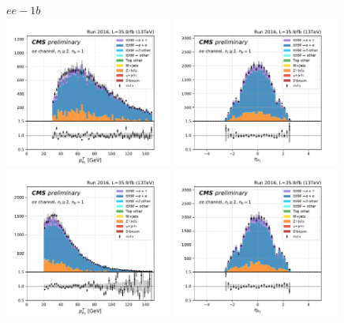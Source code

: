 












\begin{figure}[ht]
    \centering
    $ee - 1b$ \\
    \includegraphics[width=0.49\textwidth]{chapters/Appendix/sectionPlots/figures/kinematics_pickles/ee/1b/ee_1b_lepton1_pt.pdf}
    \includegraphics[width=0.49\textwidth]{chapters/Appendix/sectionPlots/figures/kinematics_pickles/ee/1b/ee_1b_lepton1_eta.pdf}
    \includegraphics[width=0.49\textwidth]{chapters/Appendix/sectionPlots/figures/kinematics_pickles/ee/1b/ee_1b_lepton2_pt.pdf}
    \includegraphics[width=0.49\textwidth]{chapters/Appendix/sectionPlots/figures/kinematics_pickles/ee/1b/ee_1b_lepton2_eta.pdf}

\end{figure}
